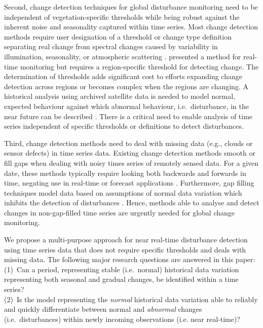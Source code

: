 \documentclass[authoryear,preprint,review,10pt]{elsarticle}
\begin{document}
Second, change detection techniques for global disturbance monitoring need to be independent of vegetation-specific thresholds while being robust against the inherent noise and seasonality captured within time series.
Most change detection methods require user designation of a threshold or change type definition separating real change from spectral changes caused by variability in illumination, seasonality, or atmospheric scattering \citep{Lu2004, Potter2003, Hayes2007}.  \citet{White2006} presented a method for real-time monitoring but requires a region-specific threshold for detecting change. The determination of thresholds adds significant cost to efforts expanding change detection across regions or becomes complex when the regions are changing. A historical analysis using archived satellite data is needed to model normal, expected behaviour against which abnormal behaviour, i.e.\ disturbance, in the near future can be described \citep{Hargrove2009}. There is a critical need to enable analysis of time series independent of specific thresholds or definitions to detect disturbances.

Third, change detection methods need to deal with missing data (e.g., clouds or sensor defects) in time series data.
Existing change detection methods smooth or fill gaps \citep{Jonsson2002, Roerink2000, Julien2010} when dealing with noisy times series of remotely sensed data. For a given date, these methods typically require looking both backwards and forwards in time, negating use in real-time or forecast applications \citep{White2006}.  Furthermore, gap filling techniques model data based on assumptions of normal data variation which inhibits the detection of disturbances \citep{Samanta:2011hp}. Hence, methods able to analyse and detect changes in non-gap-filled time series are urgently needed for global change monitoring.

We propose a multi-purpose approach for near real-time disturbance detection using time series data that does not require specific thresholds and deals with missing data. The following major research questions are answered in this paper: \\
(1)~Can a period, representing stable (i.e.\ normal) historical data variation representing both seasonal and gradual changes, be identified within a time series?\\
(2)~Is the model representing the \emph{normal} historical data variation able to reliably and quickly differentiate between normal and \emph{abnormal} changes (i.e.\ disturbances) within newly incoming observations (i.e. near real-time)?
\end{document}
